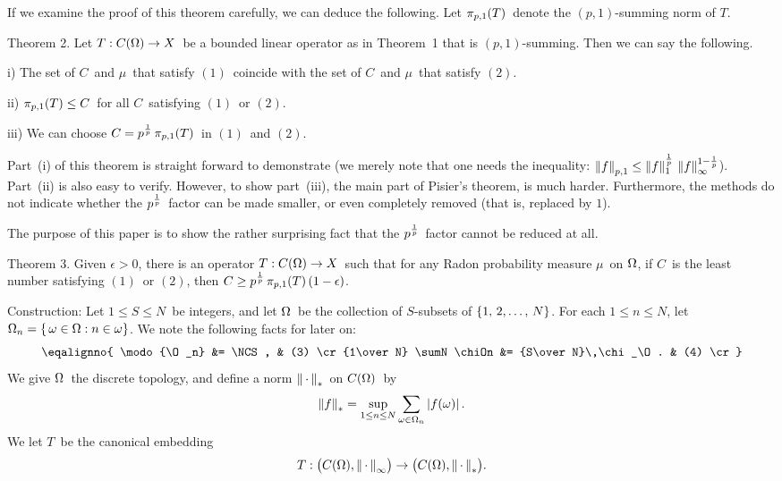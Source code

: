 If we examine the proof of this theorem carefully, we can deduce the following.
Let $\pi_{p,1}(T)$\ denote the $(p,1)$-summing norm of $T$.

\proclaim Theorem 2. Let $T:C(\Omega) \to X$\ be a bounded linear operator as in
Theorem~1 that is $(p,1)$-summing. Then we can say the following.
\item{i)} The set of $C$\ and $\mu$\ that satisfy $(1)$\
coincide with the set of $C$\ and $\mu$\ that satisfy $(2)$.
\item{ii)} $\pi_{p,1}(T) \le C$\ for all $C$\ satisfying $(1)$\ or $(2)$.
\item{iii)} We can choose $C = p^{1\over p} \, \pi_{p,1}(T)$\ in $(1)$\ and $(2)$.


Part~(i) of this theorem is straight forward to demonstrate (we merely note
that one needs the inequality: $\left\| f \right\|_{p,1} \le \left\| f \right\|_1^{1\over p} \,
\left\| f \right\|_\infty^{1-{1\over p}} $). Part~(ii) is also easy to verify. However,
to show part~(iii), the main part of Pisier's theorem, is much harder.
Furthermore, the methods do not indicate whether the $p^{1\over p}$\ factor can be
made smaller, or even completely removed (that is, replaced by $1$).

The purpose of this paper is to show the rather surprising fact that the
$p^{1\over p}$\ factor cannot be reduced at all.

\proclaim Theorem 3. Given $\epsilon>0$, there is an operator $T:C(\Omega) \to X$\
such that for any Radon probability measure $\mu$\ on $\Omega$, if $C$\ is the least
number satisfying $(1)$\ or $(2)$, then $C \ge p^{1\over p} \, \pi_{p,1}(T) \,
(1-\epsilon)$.

\heading Construction:
Let $1\le S \le N$\ be integers, and let $\Omega$\ be the collection of
$S$-subsets of $\set N$. For each $1\le n\le N$, let $\Omega_n = \{\, \omega\in\Omega
: n\in\omega \}$. We note the following facts for later on:
$$ \eqalignno{
   \modo{\O_n}             &= \NCS ,                 & (3) \cr
   {1\over N} \sumN \chiOn &= {S\over N}\,\chi_\O .  & (4) \cr }$$
We give $\Omega$\ the discrete topology, and define a norm
$\left\| \,\cdot\, \right\|_*$\ on $C(\Omega)$\ by
$$ \left\| f \right\|_* = \sup_{1\le n\le N} \sum_{\omega\in\Omega_n} \left| f(\omega) \right| .$$
We let $T$\ be the canonical embedding
$$ T : \bigl( C(\Omega) , \left\| \,\cdot\, \right\|_\infty \bigr)
   \to \bigl( C(\Omega) , \left\| \,\cdot\, \right\|_* \bigr) .$$

